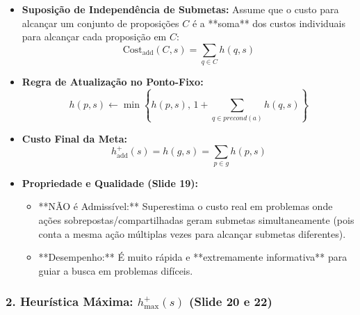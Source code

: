 \documentclass[a4paper,12pt]{article}
\begin{document}
\begin{itemize}
	\item \textbf{Suposição de Independência de Submetas:}
	Assume que o custo para alcançar um conjunto de proposições $C$ é a **soma** dos custos individuais para alcançar cada proposição em $C$:
	\begin{equation}
		\text{Cost}_{\text{add}}(C, s) = \sum_{q \in C} h(q, s)
	\end{equation}
	\item \textbf{Regra de Atualização no Ponto-Fixo:}
	\begin{equation}
		h(p, s) \leftarrow \min \left\{ h(p, s), \, 1 + \sum_{q \in precond(a)} h(q, s) \right\}
	\end{equation}
	\item \textbf{Custo Final da Meta:}
	\begin{equation}
		h_{\text{add}}^+(s) = h(g, s) = \sum_{p \in g} h(p, s)
	\end{equation}
	\item \textbf{Propriedade e Qualidade (Slide 19):}
	\begin{itemize}
		\item **NÃO é Admissível:** Superestima o custo real em problemas onde ações sobrepostas/compartilhadas geram submetas simultaneamente (pois conta a mesma ação múltiplas vezes para alcançar submetas diferentes).
		\item **Desempenho:** É muito rápida e **extremamente informativa** para guiar a busca em problemas difíceis.
	\end{itemize}
\end{itemize}

\subsubsection*{2. Heurística Máxima: $h_{\text{max}}^+(s)$ (Slide 20 e 22)}
\end{document}
